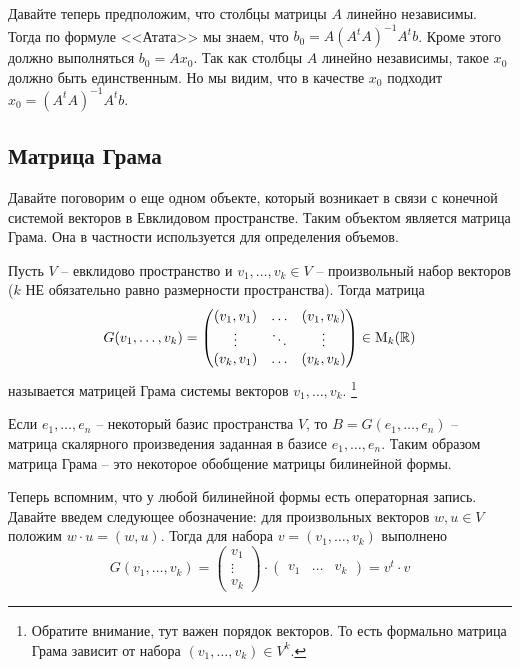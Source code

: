 Давайте теперь предположим, что столбцы матрицы $A$ линейно независимы.
Тогда по формуле <<Атата>> мы знаем, что $b_0 = A(A^tA)^{-1}A^tb$.
Кроме этого должно выполняться $b_0 = Ax_0$.
Так как столбцы $A$ линейно независимы, такое $x_0$ должно быть единственным.
Но мы видим, что в качестве $x_0$ подходит $x_0 = (A^tA)^{-1}A^tb$.

\subsection{Матрица Грама}
\label{subsection::Gram}

Давайте поговорим о еще одном объекте, который возникает в связи с конечной системой векторов в Евклидовом пространстве.
Таким объектом является матрица Грама.
Она в частности используется для определения объемов.

\begin{definition}
Пусть $V$ -- евклидово пространство и $v_1,\ldots,v_k\in V$ -- произвольный набор векторов ($k$ НЕ обязательно равно размерности пространства).
Тогда матрица
\[
G(v_1,\ldots,v_k) =
\begin{pmatrix}
{(v_1,v_1)}&{\ldots}&{(v_1,v_k)}\\
{\vdots}&{\ddots}&{\vdots}\\
{(v_k,v_1)}&{\ldots}&{(v_k,v_k)}\\
\end{pmatrix}
\in\operatorname{M}_{k}(\mathbb R)
\]
называется матрицей Грама системы векторов $v_1,\ldots,v_k$.%
\footnote{Обратите внимание, тут важен порядок векторов.
То есть формально матрица Грама зависит от набора $(v_1,\ldots,v_k)\in V^k$.}
\end{definition}

Если $e_1,\ldots,e_n$ -- некоторый базис пространства $V$, то $B = G(e_1,\ldots,e_n)$ -- матрица скалярного произведения заданная в базисе $e_1,\ldots,e_n$.
Таким образом матрица Грама -- это некоторое обобщение матрицы билинейной формы.

Теперь вспомним, что у любой билинейной формы есть операторная запись.
Давайте введем следующее обозначение: для произвольных векторов $w, u\in V$ положим $w\cdot u = (w, u)$.
Тогда для набора $v = (v_1,\ldots,v_k)$ выполнено
\[
G(v_1,\ldots,v_k) = 
\begin{pmatrix}
{v_1}\\{\vdots}\\{v_k}
\end{pmatrix}
\cdot
\begin{pmatrix}
{v_1}&{\ldots}&{v_k}
\end{pmatrix}
=
v^t \cdot v
\]

